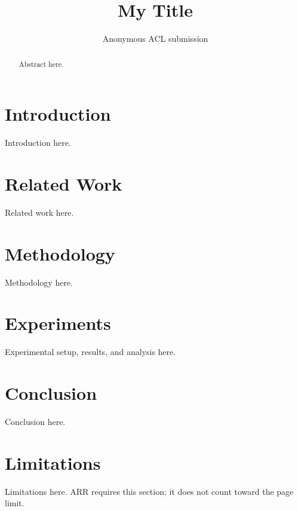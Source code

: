 \documentclass[11pt]{article}
\title{My Title}
\author{Anonymous ACL submission}
\begin{document}
\maketitle

\begin{abstract}
Abstract here.
\end{abstract}

\section{Introduction}
\label{sec:intro}
Introduction here.

\section{Related Work}
\label{sec:related_work}
Related work here.

\section{Methodology}
\label{sec:method}
Methodology here.

\section{Experiments}
\label{sec:experiments}
Experimental setup, results, and analysis here.

\section{Conclusion}
\label{sec:conclusion}
Conclusion here.

\section*{Limitations}
Limitations here. ARR requires this section; it does not count toward the page limit.



\end{document}
